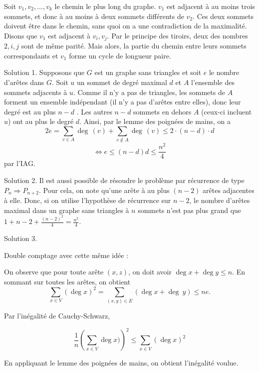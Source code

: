\begin{sol}
Soit $v_1, v_2,\ldots , v_k$ le chemin le plus long du graphe. $v_1$ est adjacent à au moins trois sommets, et donc à au moins à deux sommets différents de $v_2$. Ces deux sommets doivent être dans le chemin, sans quoi on a une contradiction de la maximalité. Disons que $v_1$ est adjacent à $v_i , v_j$. Par le principe des tiroirs, deux des nombres $2, i, j$ sont de même parité.
Mais alors, la partie du chemin entre leurs sommets correspondants et $v_1$ forme un cycle de longueur paire.
\end{sol}


\begin{sol}
Solution 1. Supposons que $G$ est un graphe sans triangles et soit $e$ le nombre d’arêtes dans $G$. Soit $u$ un sommet de degré maximal $d$ et $A$ l'ensemble des sommets adjacents à
$u$. Comme il n'y a pas de triangles, les sommets de $A$ forment un ensemble indépendant (il
n'y a pas d'arêtes entre elles), donc leur degré est au plus $n-d$ . Les autres $n-d$ sommets
en dehors $A$ (ceux-ci incluent $ u$) ont au plus le degré $d$. Ainsi, par le lemme des poignées de mains,
on a
$$ 2e = \sum_{v \in A} \deg\, (v) + \sum_{v \notin A} \deg\, (v)\le 2\cdot (n-d) \cdot d $$
$$ \Leftrightarrow e \le (n-d)d \le \frac{n^2}{4}$$
 par l’IAG.



Solution 2.
Il est aussi possible de résoudre le problème par récurrence de type $P_n \Rightarrow P_{n+2}$.
Pour cela, on note qu’une arête à au plus $(n-2)$ arêtes adjacentes à elle.
Donc, si on utilise l’hypothèse de récurrence sur $n-2$, le nombre d’arêtes maximal dans un graphe sans triangles à $n$ sommets n’est pas plus grand que $1 + n - 2 + \frac{(n-2)^2}{4}= \frac{n^2}{4}$.


Solution 3.

Double comptage avec cette même idée :

On observe que pour toute arête $(x,z)$, on doit avoir $ \deg x + \deg y \le n$.
En sommant sur toutes les arêtes, on obtient
$$ \sum_{x \in V} (\deg x)^2 = \sum_{(x,y) \in E} (\deg x + \deg\ y) \le ne.$$

Par l’inégalité de Cauchy-Schwarz,

$$ \frac{1}{n} \left(\sum_{x \in V} \deg x) \right)^2 \le \sum_{x \in V} (\deg x)^2$$

En appliquant le lemme des poignées de mains, on obtient l’inégalité voulue.
\end{sol}


